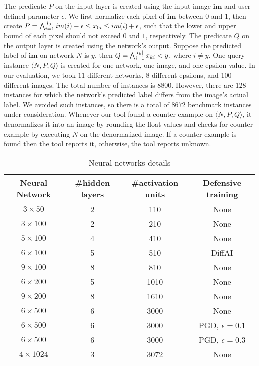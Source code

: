 The predicate $P$ on the input layer is created using the input image $\boldsymbol{im}$ and user-defined parameter $\epsilon$.  We first normalize each pixel of $\boldsymbol{im}$ between $0$ and $1$, then create  $P = \bigwedge_{i=1}^{|l_0|} im(i)-\epsilon \leq x_{0i}\leq im(i)+\epsilon$, such that the lower and upper bound of each pixel should not exceed $0$ and $1$, respectively. The predicate $Q$ on the output layer is created using the network's output.     Suppose the predicted label of $\boldsymbol{im}$ on network $N$ is $y$, then $Q = \bigwedge_{i=1}^{|l_k|} x_{ki} < y$, where $i \neq y$.  One query instance $\langle N,P,Q \rangle$ is created for one network, one image, and one epsilon value.  In our evaluation, we took $11$ different networks, 8 different epsilons, and 100 different images. The 
total number of instances is $8800$. However, there are 128 instances for which the network's predicted label differs from the image's actual label. We avoided such instances, so there is a total of $8672$ benchmark instances
under consideration.    Whenever our tool found a counter-example on $\langle N,P,Q \rangle$, it denormalizes it into an image by rounding the float values 
and checks for counter-example by executing $N$ on the denormalized image.
If a counter-example is found then the tool reports it, otherwise, the tool reports unknown.



\begin{table}[t]
    \centering
    \begin{tabular}{c|c|c|c}
        \hline
        \textbf{Neural Network} & \textbf{\#hidden layers} & \textbf{\#activation units} & \textbf{Defensive training} \\
        \hline
        $3\times 50$ & 2 & 110 & None \\
        $3\times 100$ & 2 & 210 & None  \\
        $5\times 100$ & 4 & 410 & None  \\
        $6\times 100$ & 5 & 510 & DiffAI \\
        $9\times 100$ & 8 & 810 & None  \\
        $6\times 200$ & 5 & 1010 & None  \\
        $9\times 200$ & 8 & 1610 & None  \\
        $6\times 500$ & 6 & 3000 & None  \\
        $6\times 500$ & 6 & 3000 & PGD, $\epsilon = 0.1$ \\
        $6\times 500$ & 6 & 3000 & PGD, $\epsilon = 0.3$ \\
        $4\times 1024$ & 3 & 3072 & None  \\
        \hline
    \end{tabular}
    \caption{Neural networks details}
    \label{tb:nndetail}
\end{table}

